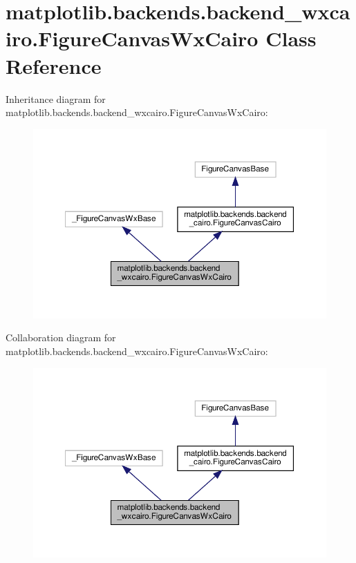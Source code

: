 \hypertarget{classmatplotlib_1_1backends_1_1backend__wxcairo_1_1FigureCanvasWxCairo}{}\section{matplotlib.\+backends.\+backend\+\_\+wxcairo.\+Figure\+Canvas\+Wx\+Cairo Class Reference}
\label{classmatplotlib_1_1backends_1_1backend__wxcairo_1_1FigureCanvasWxCairo}


Inheritance diagram for matplotlib.\+backends.\+backend\+\_\+wxcairo.\+Figure\+Canvas\+Wx\+Cairo\+:
\nopagebreak
\begin{figure}[H]
\begin{center}
\leavevmode
\includegraphics[width=350pt]{classmatplotlib_1_1backends_1_1backend__wxcairo_1_1FigureCanvasWxCairo__inherit__graph}
\end{center}
\end{figure}


Collaboration diagram for matplotlib.\+backends.\+backend\+\_\+wxcairo.\+Figure\+Canvas\+Wx\+Cairo\+:
\nopagebreak
\begin{figure}[H]
\begin{center}
\leavevmode
\includegraphics[width=350pt]{classmatplotlib_1_1backends_1_1backend__wxcairo_1_1FigureCanvasWxCairo__coll__graph}
\end{center}
\end{figure}
